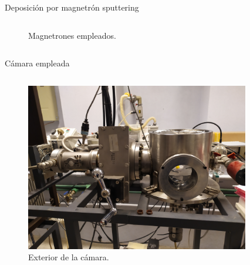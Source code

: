 \documentclass[11pt]{beamer}
\begin{document}
\begin{frame}{Deposición por magnetrón sputtering}
\begin{columns}[T]
\begin{column}{.58\textwidth}
\begin{figure}[H]
					\caption*{Magnetrones empleados.}
					\end{figure}
				\end{column}
			\end{columns}
		\end{frame}
		
		\begin{frame}{Cámara empleada}
			\begin{columns}[T]
				\begin{column}{.49\textwidth}
					\begin{figure}[H]
					\centering
					\includegraphics[scale=0.04]{img/camara.jpg}
					\caption*{Exterior de la cámara.}
					\end{figure}
				\end{column}
				\begin{column}{.49\textwidth}
					\begin{figure}[H]

\end{figure}
\end{column}
\end{columns}
\end{frame}
\end{document}
